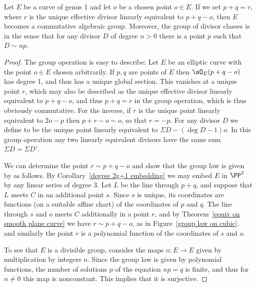\begin{proposition}\label{group law} Let $E$ be a curve of genus 1 and let $o$ be a chosen point $o\in E$.
If we set $p+q = r$, where $r$ is the unique effective divisor
linearly equivalent to $p+q-o$, then $E$ becomes a
commutative algebraic group.
Moreover, the group of divisor classes is 
%
in the sense that for any divisor $D$ of degree $n>0$
 there is a point $p$ such that $D\sim np$.
\unif
 \end{proposition}

\begin{proof}
 The group operation is easy to describe:
Let $E$ be an elliptic curve with the point $o\in E$ chosen arbitrarily. If $p,q$ are points of $E$ then $\sO_E(p+q-o)$ has degree 1, and
thus has a unique global section. This vanishes at a unique point $r$, which may also be described as the unique
effective divisor linearly equivalent to $p+q-o$, and thus 
$p+q = r$ in the group operation, which is thus obviously commutative. For the inverse, if $r$ is the  unique point
linearly equivalent to $2o-p$ then $p+r-o\sim o$, so that $r=-p$. For any divisor $D$
we define 
%
to be the unique point linearly equivalent to $\Sigma D-(\deg D-1)o$.
In this group operation any two linearly
equivalent divisors have the same sum $\Sigma D = \Sigma D'$.

We can determine the point $r\sim p+q-o$ and show that the group law
is given by 
%
as follows. By Corollary~\ref{degree 2g+1 embedding} we may embed $E$ in $\PP^2$ by any linear series
of degree 3.  Let $L$ be the line through $p+q$, and suppose that
$L$ meets $C$ in an additional point $s$. Since $s$ is unique, its coordinates are functions
%
(on a suitable affine chart) of the coordinates of $p$ and $q$. The line through $s$ and $o$ meets $C$ additionally in a point $r$,
and by Theorem~\ref{equiv on smooth plane curve} we have $r\sim p+q-o$, as in Figure~\ref{group law on cubic}.
and similarly the point $r$ is a polynomial function of the coordinates of $s$ and $o$.

To see that $E$ is a divisible group, consider the maps $n: E\to E$ given by multiplication by integers $n$. Since the
group law is given by polynomial functions, the number of solutions $p$ of the equation $np = q$ is finite, and thus
for $n\neq 0$ this map is nonconstant. This implies that it is surjective.
\end{proof}

